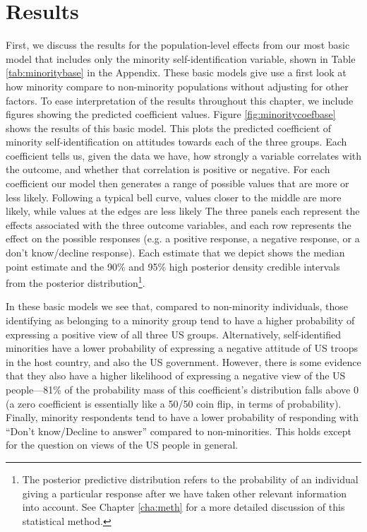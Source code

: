 \section*{Results}

First, we discuss the results for the population-level effects from our most basic model that includes only the minority self-identification variable, shown in Table \ref{tab:minoritybase} in the Appendix. These basic models give use a first look at how minority compare to non-minority populations without adjusting for other factors. To ease interpretation of the results throughout this chapter, we include figures showing the predicted coefficient values. Figure \ref{fig:minoritycoefbase} shows the results of this basic model. This plots the predicted coefficient of minority self-identification on attitudes towards each of the three groups. Each coefficient tells us, given the data we have, how strongly a variable correlates with the outcome, and whether that correlation is positive or negative. For each coefficient our model then generates a range of possible values that are more or less likely. Following a typical bell curve, values closer to the middle are more likely, while values at the edges are less likely The three panels each represent the effects associated with the three outcome variables, and each row represents the effect on the possible responses (e.g. a positive response, a negative response, or a don't know/decline response). Each estimate that we depict shows the median point estimate and the 90\% and 95\% high posterior density credible intervals from the posterior distribution\footnote{The posterior predictive distribution refers to the probability of an individual giving a particular response after we have taken other relevant information into account. See Chapter \ref{cha:meth} for a more detailed discussion of this statistical method.}. 

In these basic models we see that, compared to non-minority individuals, those identifying as belonging to a minority group tend to have a higher probability of expressing a positive view of all three US groups. Alternatively, self-identified minorities have a lower probability of expressing a negative attitude of US troops in the host country, and also the US government. However, there is some evidence that they also have a higher likelihood of expressing a negative view of the US people---81\% of the probability mass of this coefficient's distribution falls above 0 (a zero coefficient is essentially like a 50/50 coin flip, in terms of probability). Finally, minority respondents tend to have a lower probability of responding with ``Don't know/Decline to answer'' compared to non-minorities. This holds except for the question on views of the US people in general.


